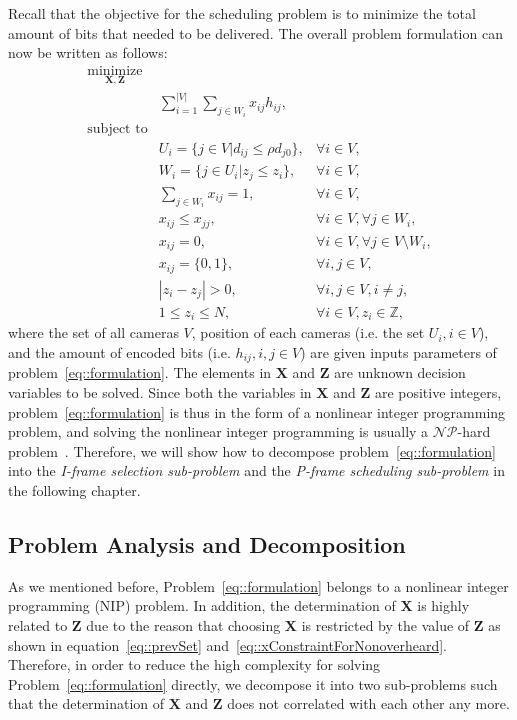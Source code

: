 Recall that the objective for the scheduling problem is to minimize the total amount of bits that needed to be delivered.
The overall problem formulation can now be written as follows:
\begin{align}
\underset{\mathbf{X},\mathbf{Z}}{\text{minimize}} & & \nonumber \\
	&\sum_{i=1}^{|V|} \sum_{j \in W_i}  x_{ij} h_{ij}, & \nonumber \\
\text{subject to} & & \nonumber \\
	&U_i = \{ j \in V | d_{ij} \leq \rho d_{j0} \}, &\forall i \in V, \nonumber \\
	&W_i = \{ j \in U_i | z_j \leq z_i \}, &\forall i \in V, \nonumber \\
	&\sum_{j \in W_i} x_{ij} = 1, &\forall i \in V, \nonumber \\
	&x_{ij} \leq x_{jj}, &\forall i \in V, \forall j \in W_i, \nonumber \\
	&x_{ij} = 0, &\forall i \in V, \forall j \in V \setminus W_i, \nonumber \\
	&x_{ij} = \{0,1\}, &\forall i,j \in V, \nonumber \\
	&|z_i - z_j| > 0, &\forall i,j \in V, i \neq j, \nonumber \\
	&1 \leq z_i \leq N, &\forall i \in V, z_i \in \mathbb{Z},
\label{eq::formulation}
\end{align}
where the set of all cameras $V$, position of each cameras (i.e. the set $U_i, i \in V$), and the amount of encoded bits (i.e. $h_{ij}, i,j \in V$) are given inputs parameters of problem~\eqref{eq::formulation}.
The elements in $\mathbf{X}$ and $\mathbf{Z}$ are unknown decision variables to be solved.
Since both the variables in $\mathbf{X}$ and $\mathbf{Z}$ are positive integers, problem~\eqref{eq::formulation} is thus in the form of a nonlinear integer programming problem, and solving the nonlinear integer programming is usually a $\mathcal{NP}$-hard problem~\cite{NIP}.
Therefore, we will show how to decompose problem~\eqref{eq::formulation} into the \emph{I-frame selection sub-problem} and the \emph{P-frame scheduling sub-problem} in the following chapter.
%
\subsection{Problem Analysis and Decomposition}
\label{sec::OverallProbAnalysis}
%
As we mentioned before, Problem~\eqref{eq::formulation} belongs to a nonlinear integer programming (NIP) problem.
In addition, the determination of $\mathbf{X}$ is highly related to $\mathbf{Z}$ due to the reason that choosing $\mathbf{X}$ is restricted by the value of $\mathbf{Z}$ as shown in equation~\eqref{eq::prevSet} and~\eqref{eq::xConstraintForNonoverheard}.
Therefore, in order to reduce the high complexity for solving Problem~\eqref{eq::formulation} directly, we decompose it into two sub-problems such that the determination of $\mathbf{X}$ and $\mathbf{Z}$ does not correlated with each other any more.

